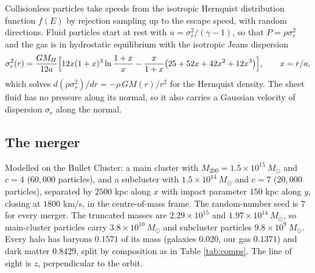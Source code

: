 \documentclass[11pt]{article}
\theoremstyle{definition}
\newcommand{\Msun}{M_{\odot}}
\begin{document}
Collisionless particles take speeds from the isotropic Hernquist distribution function $f(E)$ \cite{Hernquist1990} by rejection sampling up to the escape speed, with random directions. Fluid particles start at rest with $u = \sigma_{r}^{2}/(\gamma - 1)$, so that $P = \rho\sigma_{r}^{2}$ and the gas is in hydrostatic equilibrium with the isotropic Jeans dispersion
\[
\sigma_{r}^{2}(r) = \frac{GM_{H}}{12a}\Bigl[12x(1 + x)^{3}\ln\frac{1 + x}{x} - \frac{x}{1 + x}\bigl(25 + 52x + 42x^{2} + 12x^{3}\bigr)\Bigr], \qquad x = r/a ,
\]
which solves $d(\rho\sigma_{r}^{2})/dr = -\rho\,GM(r)/r^{2}$ for the Hernquist density. The sheet fluid has no pressure along its normal, so it also carries a Gaussian velocity of dispersion $\sigma_{r}$ along the normal.

\subsection{The merger}

Modelled on the Bullet Cluster: a main cluster with $M_{200} = 1.5 \times 10^{15}\ \Msun$ and $c = 4$ ($60{,}000$ particles), and a subcluster with $1.5 \times 10^{14}\ \Msun$ and $c = 7$ ($20{,}000$ particles), separated by $2500$ kpc along $x$ with impact parameter $150$ kpc along $y$, closing at $1800$ km/s, in the centre-of-mass frame. The random-number seed is $7$ for every merger. The truncated masses are $2.29 \times 10^{15}$ and $1.97 \times 10^{14}\ \Msun$, so main-cluster particles carry $3.8 \times 10^{10}\ \Msun$ and subcluster particles $9.8 \times 10^{9}\ \Msun$. Every halo has baryons $0.1571$ of its mass (galaxies $0.020$, our gas $0.1371$) and dark matter $0.8429$, split by composition as in Table \ref{tab:comps}. The line of sight is $z$, perpendicular to the orbit.
\end{document}
